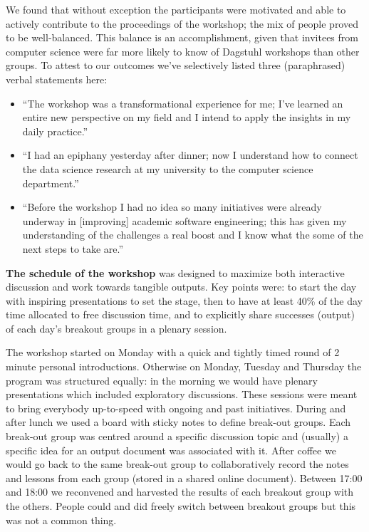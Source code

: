 \documentclass[a4paper,UKenglish]{dagrep}
\begin{document}
We found that without exception the participants were motivated and able to actively contribute to the proceedings of the workshop; the mix of people proved to be well-balanced. This balance is an accomplishment, given that invitees from computer science were far more likely to know of Dagstuhl workshops than other groups. To attest to our outcomes we've selectively listed three (paraphrased) verbal statements here:
\begin{itemize}
\item ``The workshop was a transformational experience for me; I've learned an entire new perspective on my field and I intend to apply the insights in my daily practice.''
\item ``I had an epiphany yesterday after dinner; now I understand how to connect the data science research at my university to the computer science department.''
\item ``Before the workshop I had no idea so many initiatives were already underway in [improving] academic software engineering; this has given my understanding of the challenges a real boost and I know what the some of the next steps to take are.''
\end{itemize}

\textbf{The schedule of the workshop} was designed to maximize both interactive discussion and work towards tangible outputs. Key points were: to start the day with inspiring presentations to set the stage, then to have at least 40\% of the day time allocated to free discussion time, and to explicitly share successes (output) of each day's breakout groups in a plenary session.

The workshop started on Monday with a quick and tightly timed round of 2 minute personal introductions. Otherwise on Monday, Tuesday and Thursday the program was structured equally: in the morning we would have plenary presentations which included exploratory discussions. These sessions were meant to bring everybody up-to-speed with ongoing and past initiatives. During and after lunch we used a board with sticky notes to define break-out groups. Each break-out group was centred around a specific discussion topic and (usually) a specific idea for an output document was associated with it. After coffee we would go back to the same break-out group to collaboratively record the notes and lessons from each group (stored in a shared online document). Between 17:00 and 18:00 we reconvened and harvested the results of each breakout group with the others. People could and did freely switch between breakout groups but this was not a common thing.
\end{document}
